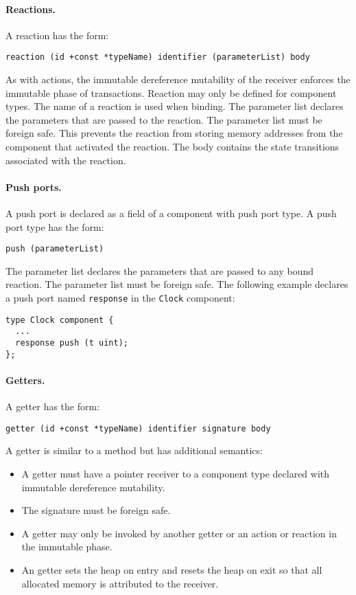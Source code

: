 \paragraph{Reactions.}
A reaction has the form:
\begin{verbatim}
reaction (id +const *typeName) identifier (parameterList) body
\end{verbatim}
As with actions, the immutable dereference mutability of the receiver enforces the immutable phase of transactions.
Reaction may only be defined for component types.
The name of a reaction is used when binding.
The parameter list declares the parameters that are passed to the reaction.
The parameter list must be foreign safe.
This prevents the reaction from storing memory addresses from the component that activated the reaction.
The body contains the state transitions associated with the reaction.

\paragraph{Push ports.}
A push port is declared as a field of a component with push port type.
A push port type has the form:
\begin{verbatim}
push (parameterList)
\end{verbatim}
The parameter list declares the parameters that are passed to any bound reaction.
The parameter list must be foreign safe.
The following example declares a push port named \verb+response+ in the \verb+Clock+ component:
\begin{verbatim}
type Clock component {
  ...
  response push (t uint);
};
\end{verbatim}

\paragraph{Getters.}
A getter has the form:
\begin{verbatim}
getter (id +const *typeName) identifier signature body
\end{verbatim}
A getter is similar to a method but has additional semantics:
\begin{itemize}
\item A getter must have a pointer receiver to a component type declared with immutable dereference mutability.
\item The signature must be foreign safe.
\item A getter may only be invoked by another getter or an action or reaction in the immutable phase.
\item An getter sets the heap on entry and resets the heap on exit so that all allocated memory is attributed to the receiver.
\end{itemize}

